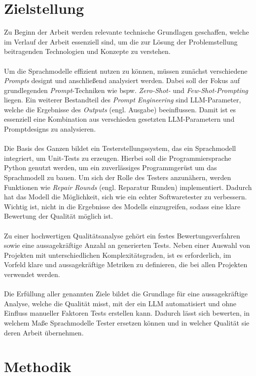 \section{Zielstellung} 
Zu Beginn der Arbeit werden relevante technische Grundlagen geschaffen, welche im Verlauf der Arbeit essenziell sind, um die zur Lösung der Problemstellung beitragenden Technologien und Konzepte zu verstehen.\\\\ Um die Sprachmodelle effizient nutzen zu können, müssen zunächst verschiedene \textit{Prompts} designt und anschließend analysiert werden. Dabei soll der Fokus auf grundlegenden \textit{Prompt}-Techniken wie bspw. \textit{Zero-Shot-} und \textit{Few-Shot-Prompting} liegen. Ein weiterer Bestandteil des \textit{Prompt Engineering} sind LLM-Parameter, welche die Ergebnisse des \textit{Outputs} (engl. Ausgabe) beeinflussen. Damit ist es essenziell eine Kombination aus verschieden gesetzten LLM-Parametern und Promptdesigns zu analysieren.\\\\ Die Basis des Ganzen bildet ein Testerstellungssystem, das ein Sprachmodell integriert, um Unit-Tests zu erzeugen. Hierbei soll die Programmiersprache Python genutzt werden, um ein zuverlässiges Programmgerüst um das Sprachmodell zu bauen. 
Um sich der Rolle des Testers anzunähern, werden Funktionen wie \textit{Repair Rounds} (engl. Reparatur Runden) implementiert. Dadurch hat das Modell die Möglichkeit, sich wie ein echter Softwaretester zu verbessern. Wichtig ist, nicht in die Ergebnisse des Modells einzugreifen, sodass eine klare Bewertung der Qualität möglich ist.\\\\ Zu einer hochwertigen Qualitätsanalyse gehört ein festes Bewertungsverfahren sowie eine aussagekräftige Anzahl an generierten Tests. Neben einer Auswahl von Projekten mit unterschiedlichen Komplexitätsgraden, ist es erforderlich, im Vorfeld klare und aussagekräftige Metriken zu definieren, die bei allen Projekten verwendet werden.\\\\ Die Erfüllung aller genannten Ziele bildet die Grundlage für eine aussagekräftige Analyse, welche die Qualität misst, mit der ein LLM automatisiert und ohne Einfluss manueller Faktoren Tests erstellen kann. Dadurch lässt sich bewerten, in welchem Maße Sprachmodelle Tester ersetzen können und in welcher Qualität sie deren Arbeit übernehmen.

\section{Methodik}
